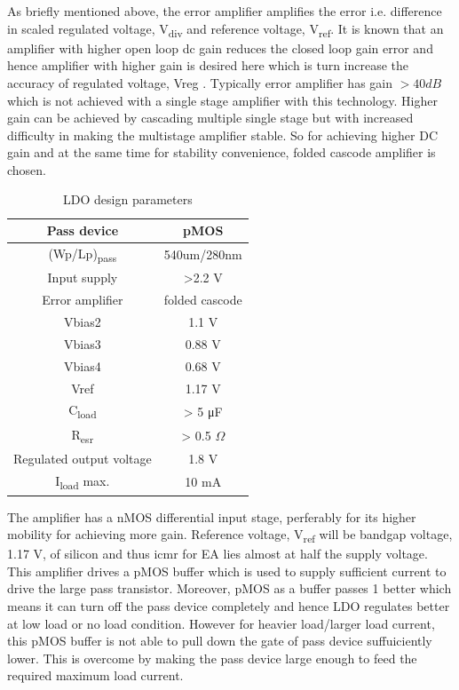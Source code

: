 \documentclass[UKenglish]{ifimaster}  %
\begin{document}
As briefly mentioned above, the error amplifier amplifies the error i.e. difference in scaled regulated voltage, 
V\textsubscript{div} and reference voltage, V\textsubscript{ref}. It is known that an amplifier with higher 
open loop \acrshort{dc} gain reduces the closed loop gain error and hence amplifier with higher gain is desired 
here which is turn increase the accuracy of regulated voltage, Vreg \cite{ldo_bulkmod}. Typically error amplifier 
has gain $> 40 dB$ which is not achieved with a single stage amplifier with this technology. Higher gain can be 
achieved by cascading multiple single stage but with increased difficulty in making the multistage
amplifier stable. So for achieving higher DC gain and at the same time for stability convenience, folded cascode 
amplifier \cite[pp. xx]{razavi_2001} is chosen. \\

\begin{table}[H]
\caption{LDO design parameters}
\begin{center}
\begin{tabular}{c|c}
\hline \hline
Pass device				& pMOS \\ \hline
(Wp/Lp)\textsubscript{pass} 	& 540um/280nm \\ \hline
Input supply 				& >2.2 V \\ \hline
Error amplifier				& folded cascode \\ \hline
Vbias2 					& 1.1 V \\ \hline
Vbias3					& 0.88 V \\ \hline
Vbias4					& 0.68 V \\ \hline
Vref						& 1.17 V \\ \hline
C\textsubscript{load} 		& > 5 \si{\micro\farad}  \\ \hline
R\textsubscript{esr} 	 		& > 0.5 $\Omega$ \\ \hline
Regulated output voltage 		& 1.8 V \\ \hline
I\textsubscript{load} max. 		& 10 mA \\
\hline \hline
\end{tabular}
\end{center}
\label{tab:ldo_parameter}
\end{table}

The amplifier has a nMOS differential input stage, perferably for its higher mobility for achieving more gain.
Reference voltage, V\textsubscript{ref} will be bandgap voltage, 1.17 V, of silicon and  thus \acrshort{icmr} 
for EA lies almost at half the supply voltage. This amplifier drives a pMOS buffer which is used to supply 
sufficient current to drive the large pass transistor. Moreover, pMOS as a buffer passes 1 better which means 
it can turn off the pass device completely and hence LDO regulates better at low load or no load condition. 
However for heavier load/larger load current, this pMOS buffer is not able to pull down the gate of pass device 
suffuiciently lower. This is overcome by making the pass device large enough to feed the required  maximum 
load current.\\
\end{document}
